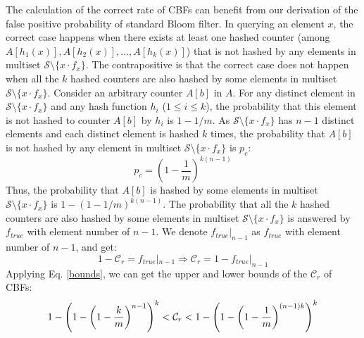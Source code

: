 The calculation of the correct rate of CBFs can benefit from our derivation of the false positive probability of standard Bloom filter.
In querying an element $x$, the correct case happens when there exists at least one hashed counter (among $A[h_1(x)], A[h_2(x)], ..., A[h_k(x)]$) that is not hashed by any elements in multiset $\mathcal{S} \setminus \{x \cdot f_x\}$. 
The contrapositive is that the correct case does not happen when all the $k$ hashed counters are also hashed by some elements in multiset $\mathcal{S} \setminus \{x \cdot f_x\}$. 
Consider an arbitrary counter $A[b]$ in $A$.
%
For any distinct element in $\mathcal{S} \setminus \{x \cdot f_x\}$ and any hash function $h_i$ ($1 \leqslant i \leqslant k$), the probability that this element is not hashed to counter $A[b]$ by $h_i$ is $1-1/m$.
%
As $\mathcal{S} \setminus \{x \cdot f_x\}$ has $n-1$ distinct elements and each distinct element is hashed $k$ times, the probability that $A[b]$ is not hashed by any element in multiset $\mathcal{S} \setminus \{x \cdot f_x\}$ is $p_c$:
%
\begin{equation}
p_c=\left(1-\dfrac{1}{m}\right)^{k(n-1)}
\label{pform_c}
\end{equation}
%
Thus, the probability that $A[b]$ is hashed by some elements in multiset $\mathcal{S} \setminus \{x \cdot f_x\}$ is $1-(1-1/m)^{k(n-1)}$. 
The probability that all the $k$ hashed counters are also hashed by some elements in multiset $\mathcal{S} \setminus \{x \cdot f_x\}$ is answered by $f_{true}$ with element number of $n-1$. 
We denote $f_{true}|_{n-1}$ as $f_{true}$ with element number of $n-1$, and get: 
\begin{equation}
1 - \mathcal{C}_r = f_{true}|_{n-1} \Rightarrow \mathcal{C}_r = 1 - f_{true}|_{n-1}
\end{equation}
Applying Eq. \ref{bounds}, we can get the upper and lower bounds of the $\mathcal{C}_r$ of CBFs: 
\begin{equation}
{\small
\begin{aligned}
\label{cbfbounds}
1 - \left( 1- \left( 1-\dfrac{k}{m} \right)^{n-1} \right) ^k < \mathcal{C}_r < 1 - \left( 1- \left( 1-\dfrac{1}{m} \right)^{(n-1)k} \right) ^k
\end{aligned}
}
\end{equation}

